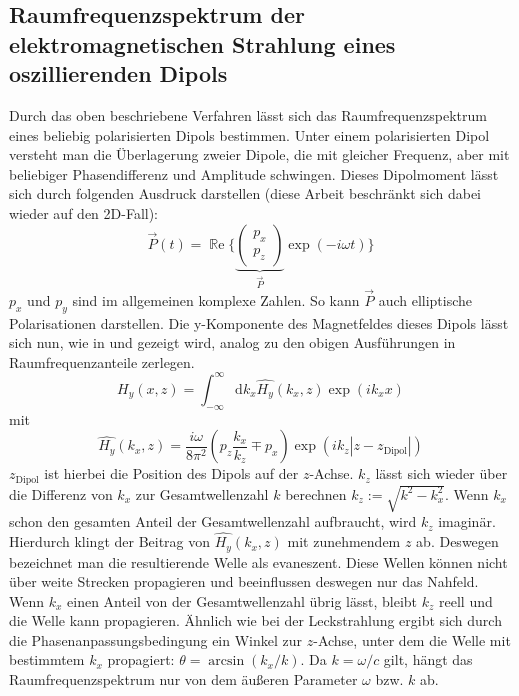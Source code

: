 \documentclass[a4paper, titlepage,  ngerman]{book}
\renewcommand{\Re}{\operatorname{\mathbb{R}e}}
\begin{document}
	\subsection{Raumfrequenzspektrum der elektromagnetischen Strahlung eines oszillierenden Dipols}
	\label{sec:spatial_freq_dip}
	Durch das oben beschriebene Verfahren lässt sich das Raumfrequenzspektrum eines beliebig polarisierten Dipols bestimmen. Unter einem polarisierten Dipol versteht man die Überlagerung zweier Dipole, die mit gleicher Frequenz, aber mit beliebiger Phasendifferenz und Amplitude schwingen. Dieses Dipolmoment lässt sich durch folgenden Ausdruck darstellen (diese Arbeit beschränkt sich dabei wieder auf den 2D-Fall): 
	$$\vec{P}(t)= \Re\biggl\{\underbrace{\begin{pmatrix} p_x \\ p_z \end{pmatrix}}_{\vec{P}} \exp(-i\omega t)\biggr\} $$
	$p_x$ und $p_y$ sind im allgemeinen komplexe Zahlen. So kann $\vec{P}$ auch elliptische Polarisationen darstellen. Die y-Komponente des Magnetfeldes dieses Dipols lässt sich nun, wie in \cite{Novotny.2012b} und \cite{RodriguezFortuno.2013} gezeigt wird, analog zu den obigen Ausführungen in Raumfrequenzanteile zerlegen.
	\begin{equation}
		H_y(x, z) = \int_{-\infty}^{\infty}\mathrm{d}k_x\hat{H_y}(k_x, z)\exp(ik _xx) 
	\end{equation}
	mit
	\begin{equation}
		\label{eq:spatial_freq_dip}
		\boxed{\hat{H_y}(k_x, z) = \dfrac{i\omega}{8\pi^2}\left(p_z\dfrac{k_x}{k_z} \mp p_x\right)\exp(ik_z|z-z_{\mathrm{Dipol}}|)}
	\end{equation}
	$z_{\mathrm{Dipol}}$ ist hierbei die Position des Dipols auf der $z$-Achse. $k_z$ lässt sich wieder über die Differenz von $k_x$ zur Gesamtwellenzahl $k$ berechnen $k_z := \sqrt{k^2-k_x^2}$. Wenn $k_x$ schon den gesamten Anteil der Gesamtwellenzahl aufbraucht,  wird $k_z$ imaginär. Hierdurch klingt der Beitrag von $\hat{H_y}(k_x, z)$ mit zunehmendem $z$ ab. Deswegen bezeichnet man die resultierende Welle als evaneszent. Diese Wellen können nicht über weite Strecken propagieren und beeinflussen deswegen nur das Nahfeld. Wenn $k_x$ einen Anteil von der Gesamtwellenzahl übrig lässt, bleibt $k_z$ reell und die Welle kann propagieren. Ähnlich wie bei der Leckstrahlung ergibt sich durch die Phasenanpassungsbedingung ein Winkel zur $z$-Achse, unter dem die Welle mit bestimmtem $k_x$ propagiert: $\theta = \arcsin(k_x/k)$. Da $k = \omega / c$ gilt, hängt das Raumfrequenzspektrum nur von dem äußeren Parameter $\omega$ bzw. $k$ ab. 
\end{document}

